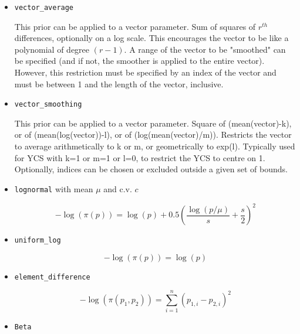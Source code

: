 \begin{itemize}
	\item \texttt{vector\_average}\label{sec:AdditionalPrior-VectorAverage}

	This prior can be applied to a vector parameter. Sum of squares of $r^{th}$ differences, optionally on a log scale. This encourages the vector to be like a polynomial of degree $(r-1)$. A range of the vector to be "smoothed" can be specified (and if not, the smoother is applied to the entire vector). However, this restriction must be specified by an index of the vector and must be between 1 and the length of the vector, inclusive.

	\item \texttt{vector\_smoothing}\label{sec:AdditionalPrior-VectorSmoothing}

	This prior can be applied to a vector parameter. Square of (mean(vector)-k), or of (mean(log(vector))-l), or of (log(mean(vector)/m)). Restricts the vector to average arithmetically to k or m, or geometrically to exp(l). Typically used for YCS with k=1 or m=1 or l=0, to restrict the YCS to centre on 1. Optionally, indices can be chosen or excluded outside a given set of bounds.

	\item\texttt{lognormal} with mean $\mu$ and c.v. $c$\label{sec:AdditionalPrior-LogNormal}

	\begin{equation}
	- \log \left(\pi \left(p \right) \right) = \log \left( p \right) + 0.5 \left( \frac{\log \left( p / \mu \right)}{s} + \frac{s}{2} \right)^2
	\end{equation}

	\item\texttt{uniform\_log}\label{sec:AdditionalPrior-UniformLog}

	\begin{equation}
	- \log \left(\pi \left(p \right) \right) = \log \left( p \right)
	\end{equation}

	\item\texttt{element\_difference}\label{sec:AdditionalPrior-ElementDifference}

	\begin{equation}
	- \log \left(\pi \left(p_1,p_2 \right) \right) = \sum_{i = 1}^n \left( p_{1,i} - p_{2,i} \right)^2
	\end{equation}

	\item\texttt{Beta}\label{sec:AdditionalPrior-Beta}


\end{itemize}
